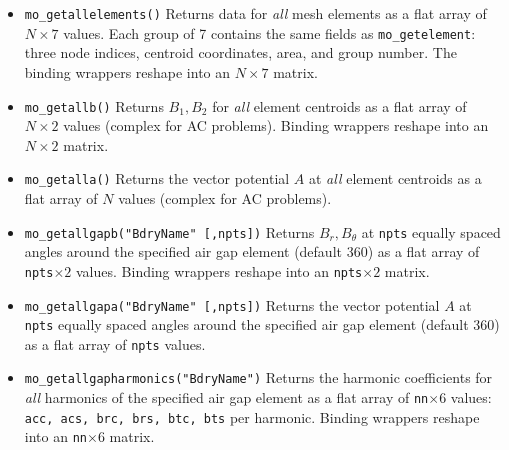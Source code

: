 \begin{itemize}
\item{\tt mo\_getallelements()} Returns data for {\em all} mesh elements as
a flat array of $N \times 7$ values.  Each group of 7 contains the same
fields as {\tt mo\_getelement}: three node indices, centroid coordinates,
area, and group number.  The binding wrappers reshape into an $N \times 7$
matrix.

\item{\tt mo\_getallb()} Returns $B_1, B_2$ for {\em all} element centroids
as a flat array of $N \times 2$ values (complex for AC problems).  Binding
wrappers reshape into an $N \times 2$ matrix.

\item{\tt mo\_getalla()} Returns the vector potential $A$ at {\em all}
element centroids as a flat array of $N$ values (complex for AC problems).

\item{\verb+mo_getallgapb("BdryName" [,npts])+} Returns $B_r, B_\theta$ at
{\tt npts} equally spaced angles around the specified air gap element
(default 360) as a flat array of {\tt npts}$\times 2$ values.  Binding
wrappers reshape into an {\tt npts}$\times 2$ matrix.

\item{\verb+mo_getallgapa("BdryName" [,npts])+} Returns the vector
potential $A$ at {\tt npts} equally spaced angles around the specified air
gap element (default 360) as a flat array of {\tt npts} values.

\item{\verb+mo_getallgapharmonics("BdryName")+} Returns the harmonic
coefficients for {\em all} harmonics of the specified air gap element as a
flat array of {\tt nn}$\times 6$ values: {\tt acc, acs, brc, brs, btc, bts}
per harmonic.  Binding wrappers reshape into an {\tt nn}$\times 6$ matrix.

\end{itemize}
